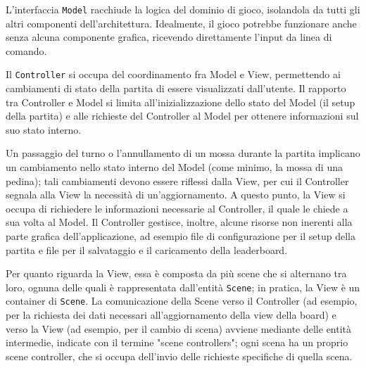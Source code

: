 \documentclass[a4paper,12pt]{report}
\begin{document}
L'interfaccia \texttt{Model} racchiude la logica del dominio di gioco, isolandola da tutti gli altri componenti dell'architettura. Idealmente, il gioco potrebbe funzionare anche senza alcuna componente grafica, ricevendo direttamente l'input da linea di comando.

Il \texttt{Controller} si occupa del coordinamento fra Model e View, permettendo ai cambiamenti di stato della partita di essere visualizzati dall'utente. Il rapporto tra Controller e Model si limita all'inizializzazione dello stato del Model (il setup della partita) e alle richieste del Controller al Model per ottenere informazioni sul suo stato interno.

Un passaggio del turno o l'annullamento di un mossa durante la partita implicano un cambiamento nello stato interno del Model (come minimo, la mossa di una pedina); tali cambiamenti devono essere riflessi dalla View, per cui il Controller segnala alla View la necessità di un'aggiornamento. A questo punto, la View si occupa di richiedere le informazioni necessarie al Controller, il quale le chiede a sua volta al Model.
Il Controller gestisce, inoltre, alcune risorse non inerenti alla parte grafica dell'applicazione, ad esempio file di configurazione per il setup della partita e file per il salvataggio e il caricamento della leaderboard.

Per quanto riguarda la View, essa è composta da più scene che si alternano tra loro, ognuna delle quali è rappresentata dall'entità \texttt{Scene}; in pratica, la View è un container di \texttt{Scene}. La comunicazione della Scene verso il Controller (ad esempio, per la richiesta dei dati necessari all'aggiornamento della view della board) e verso la View (ad esempio, per il cambio di scena) avviene mediante delle entità intermedie, indicate con il termine "scene controllers"; ogni scena ha un proprio scene controller, che si occupa dell'invio delle richieste specifiche di quella scena.
\end{document}
